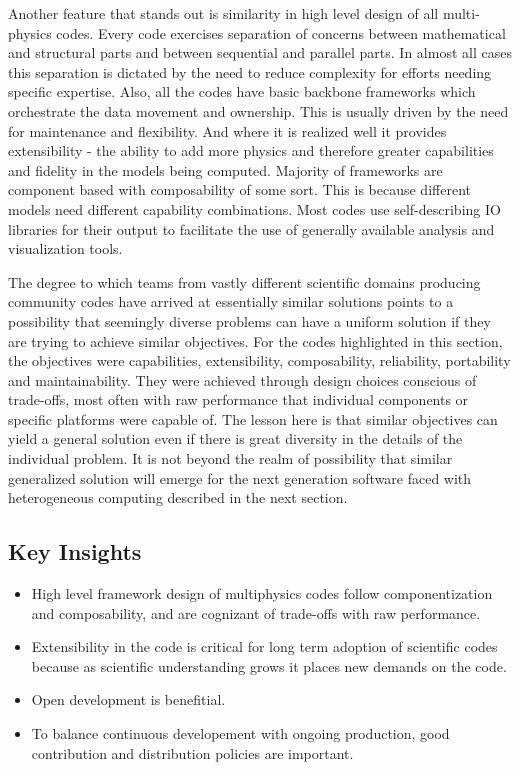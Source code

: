 Another feature that stands out is similarity in high level design of
all multi-physics codes. Every code exercises separation of concerns
between mathematical and structural parts and between sequential and
parallel parts. In almost all cases this separation is dictated by the
need to reduce complexity for efforts needing specific
expertise. Also, all the codes have basic backbone frameworks which
orchestrate the data movement and ownership. This is
usually driven by the need for maintenance and flexibility. And where
it is realized well it provides extensibility - the ability to add
more physics and therefore greater capabilities and fidelity in the
models being computed. Majority of frameworks are component based with
composability of some sort. This is because different models need
different capability combinations. Most codes use self-describing IO
libraries for their output to facilitate the use of generally
available analysis and visualization tools. 

The degree to which teams from vastly different scientific domains
producing community codes have arrived at essentially similar
solutions points to a possibility that seemingly
diverse problems can have a uniform solution if they are trying to
achieve similar objectives. For the codes highlighted in this section,
the objectives were capabilities, extensibility, composability,
reliability, portability and maintainability. They were achieved
through design choices conscious of trade-offs, most often with raw
performance that individual components or specific platforms were
capable of. The lesson here is that similar objectives can yield a
general solution even if there is great diversity in the details of
the individual problem. It is not beyond the realm of possibility that
similar generalized solution will emerge for the next generation
software faced with heterogeneous computing described in the next
section.

\subsection*{Key Insights}
\label{caseStudies-insights}
\begin{itemize}
\item High level framework design of multiphysics codes follow
componentization and composability, and are cognizant of trade-offs
with raw performance.
\item Extensibility in the code is critical for long term adoption of
scientific codes because as scientific understanding grows it places
new demands on the code.
\item Open development is benefitial.
\item To balance continuous developement with ongoing production,
good contribution and distribution policies are important. 
\end{itemize}